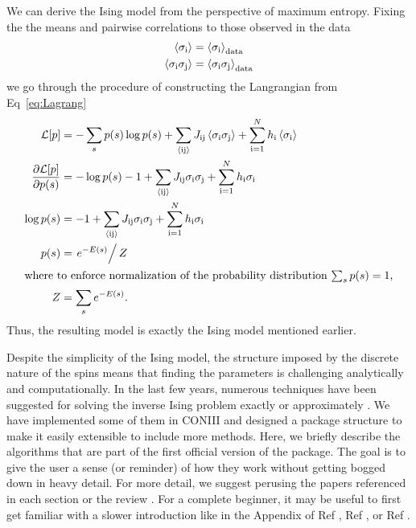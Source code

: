 \documentclass[aps,prl,twocolumn,nofootinbib]{revtex4-1}
\begin{document}
We can derive the Ising model from the perspective of maximum entropy. Fixing the the means and pairwise correlations to those observed in the data
\begin{align}
	\left<\sigma_{\rm i}\right> &= \left<\sigma_{\rm i}\right>_{\rm data} \\
	\left<\sigma_{\rm i}\sigma_{\rm j}\right> &= \left<\sigma_{\rm i}\sigma_{\rm j}\right>_{\rm data}
\end{align}
we go through the procedure of constructing the Langrangian from Eq~\ref{eq:Lagrang}
\begin{align}
	\mathcal{L}[p] &= -\sum_s p(s)\log p(s) +\sum_{\rm \left<ij\right>} J_{\rm ij}\left<\sigma_{\rm i}\sigma_{\rm j}\right> +\sum_{\rm i=1}^Nh_{\rm i}\left<\sigma_{\rm i}\right>\\
	\frac{\partial\mathcal{L}[p]}{\partial p(s)} &= -\log p(s)-1 +\sum_{\rm \left<ij\right>} J_{\rm ij}\sigma_{\rm i}\sigma_{\rm j} +\sum_{\rm i=1}^Nh_{\rm i}\sigma_{\rm i}\\
	\log p(s) &= -1 +\sum_{\rm \left<ij\right>} J_{\rm ij}\sigma_{\rm i}\sigma_{\rm j} +\sum_{\rm i=1}^Nh_{\rm i}\sigma_{\rm i}\\
	p(s) &= \left.e^{-E(s)}\right/Z\\
\intertext{where to enforce normalization of the probability distribution $\sum_s p(s) = 1$,}
	Z &= \sum_s e^{-E(s)}.
\end{align}
Thus, the resulting model is exactly the Ising model mentioned earlier.

Despite the simplicity of the Ising model, the structure imposed by the discrete nature of the spins means that finding the parameters is challenging analytically and computationally. In the last few years, numerous techniques have been suggested for solving the inverse Ising problem exactly or approximately \cite{Nguyen:2017ww}. We have implemented some of them in CONIII and designed a package structure to make it easily extensible to include more methods.  Here, we briefly describe the algorithms that are part of the first official version of the package. The goal is to give the user a sense (or reminder) of how they work without getting bogged down in heavy detail. For more detail, we suggest perusing the papers referenced in each section or the review \cite{Nguyen:2017ww}. For a complete beginner, it may be useful to first get familiar with a slower introduction like in the Appendix of Ref \cite{Lee:2015ev}, Ref \cite{Bialek:2012ueb}, or Ref \cite{Bretthorst:2003ua}.

\end{document}
